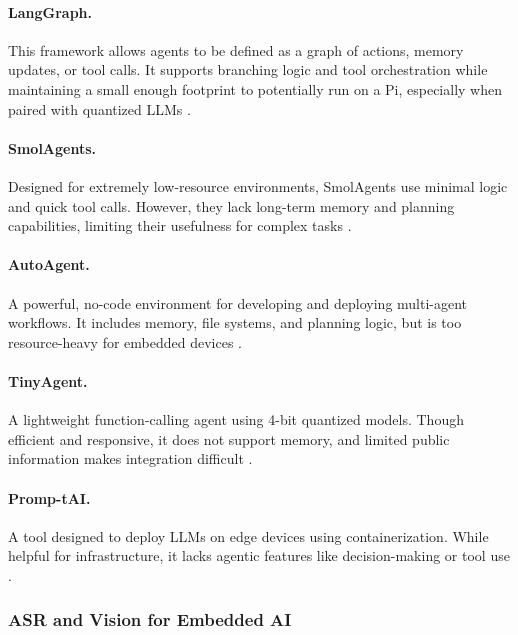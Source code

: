 \paragraph{LangGraph.} This framework allows agents to be defined as a graph of actions, memory updates, or tool calls. It supports branching logic and tool orchestration while maintaining a small enough footprint to potentially run on a Pi, especially when paired with quantized LLMs \cite{langchain_agent_2024, kumari_smolagents_2025}.

\paragraph{SmolAgents.} Designed for extremely low-resource environments, SmolAgents use minimal logic and quick tool calls. However, they lack long-term memory and planning capabilities, limiting their usefulness for complex tasks \cite{kumari_smolagents_2025, xi_rise_2023}.

\paragraph{AutoAgent.} A powerful, no-code environment for developing and deploying multi-agent workflows. It includes memory, file systems, and planning logic, but is too resource-heavy for embedded devices \cite{tang_autoagent_2025}.

\paragraph{TinyAgent.} A lightweight function-calling agent using 4-bit quantized models. Though efficient and responsive, it does not support memory, and limited public information makes integration difficult \cite{erdogan2024tinyagent}.

\paragraph{Promp-tAI.} A tool designed to deploy LLMs on edge devices using containerization. While helpful for infrastructure, it lacks agentic features like decision-making or tool use \cite{nezami2024promptai}.


\subsubsection{ASR and Vision for Embedded AI}

